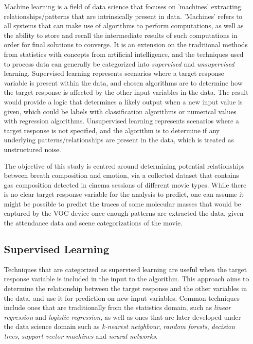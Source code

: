 \documentclass[letterpaper, 10 pt, conference]{ieeeconf}  %
\begin{document}
Machine learning \cite{geron2017hands} is a field of data science that focuses on 'machines' extracting relationships/patterns that are intrinsically present in data. 'Machines' refers to all systems that can make use of algorithms to perform computations, as well as the ability to store and recall the intermediate results of such computations in order for final solutions to converge. It is an extension on the traditional methods from statistics with concepts from artificial intelligence, and the techniques used to process data can generally be categorized into \textit{supervised} and \textit{unsupervised} learning. Supervised learning represents scenarios where a target response variable is present within the data, and chosen algorithms are to determine how the target response is affected by the other input variables in the data. The result would provide a logic that determines a likely output when a new input value is given, which could be labels with classification algorithms or numerical values with regression algorithms. Unsupervised learning represents scenarios where a target response is not specified, and the algorithm is to determine if any underlying patterns/relationships are present in the data, which is treated as unstructured noise. 

The objective of this study is centred around determining potential relationships between breath composition and emotion, via a collected dataset that contains gas composition detected in cinema sessions of different movie types. While there is no clear target response variable for the analysis to predict, one can assume it might be possible to predict the traces of some molecular masses that would be captured by the VOC device once enough patterns are extracted the data, given the attendance data and scene categorizations of the movie.

\subsection{Supervised Learning}

Techniques that are categorized as supervised learning \cite{geron2017hands} are useful when the target response variable is included in the input to the algorithm. This approach aims to determine the relationship between the target response and the other variables in the data, and use it for prediction on new input variables. Common techniques include ones that are traditionally from the statistics domain, such as \textit{linear regression} and \textit{logistic regression}, as well as ones that are later developed under the data science domain such as \textit{k-nearest neighbour}, \textit{random forests}, \textit{decision trees}, \textit{support vector machines} and \textit{neural networks}.
\end{document}
